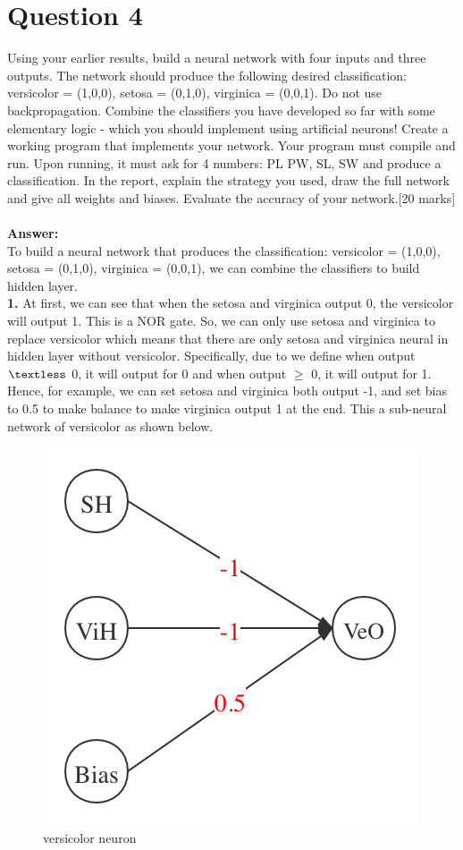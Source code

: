 \documentclass{article}
\begin{document}
\section{Question 4}
Using your earlier results, build a neural network with four inputs and three outputs. The network should produce the following desired classification: versicolor = (1,0,0), setosa = (0,1,0), virginica = (0,0,1). Do not use backpropagation. Combine the classifiers you have developed so far with some elementary logic - which you should implement using artificial neurons! Create a working program that implements your network. Your program must compile and run. Upon running, it must ask for 4 numbers: PL PW, SL, SW and produce a classification. In the report, explain the strategy you used, draw the full network and give all weights and biases. Evaluate the accuracy of your network.[20 marks]\\\\
\textbf{Answer:}\\
To build a neural network that produces the classification: versicolor = (1,0,0), setosa = (0,1,0), virginica = (0,0,1), we can combine the classifiers to build hidden layer. \\
\textbf{1.} At first, we can see that when the setosa and virginica output 0, the versicolor will output 1. This is a NOR gate. So, we can only use setosa and virginica to replace versicolor which means that there are only setosa and virginica neural in hidden layer without versicolor. Specifically, due to we define when output $\textless$ 0, it will output for 0 and when output $\geq$ 0, it will output for 1. Hence, for example, we can set setosa and virginica both output -1, and set bias to 0.5 to make balance to make virginica output 1 at the end. This a sub-neural network of versicolor as shown below. 
\begin{figure}[H]
\centering
\includegraphics[scale=0.3]{VeO.png}
\caption{versicolor neuron}
\end{figure}
\end{document}
